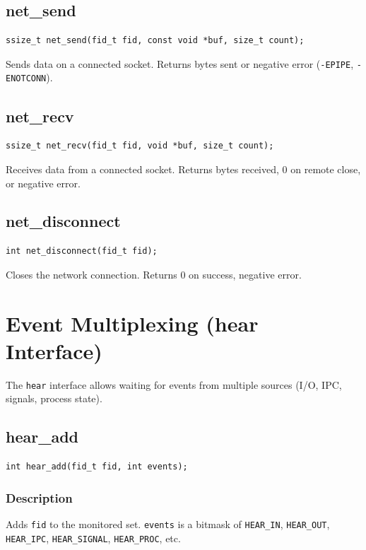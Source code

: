 \documentclass[12pt,a4paper]{article}
\begin{document}
\subsection{net\_send}
\begin{lstlisting}
ssize_t net_send(fid_t fid, const void *buf, size_t count);
\end{lstlisting}
Sends data on a connected socket. Returns bytes sent or negative error (\texttt{-EPIPE}, \texttt{-ENOTCONN}).

\subsection{net\_recv}
\begin{lstlisting}
ssize_t net_recv(fid_t fid, void *buf, size_t count);
\end{lstlisting}
Receives data from a connected socket. Returns bytes received, 0 on remote close, or negative error.

\subsection{net\_disconnect}
\begin{lstlisting}
int net_disconnect(fid_t fid);
\end{lstlisting}
Closes the network connection. Returns 0 on success, negative error.

\section{Event Multiplexing (hear Interface)}
\label{sec:hear}

The \texttt{hear} interface allows waiting for events from multiple sources (I/O, IPC, signals, process state).

\subsection{hear\_add}
\begin{lstlisting}
int hear_add(fid_t fid, int events);
\end{lstlisting}

\subsubsection{Description}
Adds \texttt{fid} to the monitored set. \texttt{events} is a bitmask of \texttt{HEAR\_IN}, \texttt{HEAR\_OUT}, \texttt{HEAR\_IPC}, \texttt{HEAR\_SIGNAL}, \texttt{HEAR\_PROC}, etc.
\end{document}
